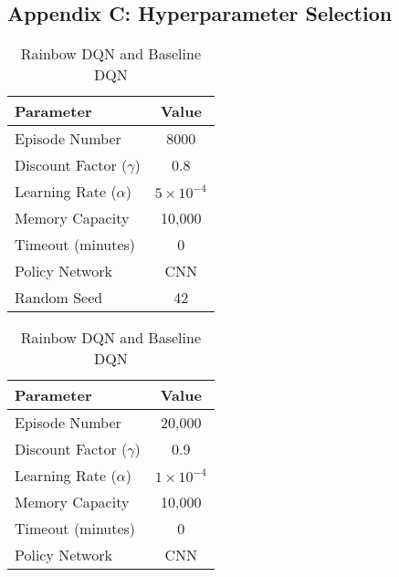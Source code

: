 \documentclass{article}
\begin{document}
\subsection*{Appendix C: Hyperparameter Selection}
\label{sec:hyperparametwe_selection}
\begin{table}[ht]
    \centering
    \begin{minipage}{0.45\textwidth}
        \centering
        \begin{tabular}{|l|c|}
        \hline
        \textbf{Parameter}      & \textbf{Value} \\ \hline
        Episode Number          & 8000           \\ \hline
        Discount Factor (\(\gamma\)) & 0.8             \\ \hline
        Learning Rate (\(\alpha\))   & \(5 \times 10^{-4}\) \\ \hline
        Memory Capacity         & 10,000         \\ \hline
        Timeout (minutes)       & 0              \\ \hline
        Policy Network          & CNN            \\ \hline
        Random Seed             & 42             \\ \hline
        \end{tabular}
        \vspace*{4pt}
        \caption{DQN extensions}
        \label{tab:algorithm_performance}
    \end{minipage}
    \hfill
    \begin{minipage}{0.45\textwidth}
        \centering
        \begin{tabular}{|l|c|}
        \hline
        \textbf{Parameter}      & \textbf{Value} \\ \hline
        Episode Number          & 20,000           \\ \hline
        Discount Factor (\(\gamma\)) & 0.9             \\ \hline
        Learning Rate (\(\alpha\))   & \(1 \times 10^{-4}\) \\ \hline
        Memory Capacity         & 10,000         \\ \hline
        Timeout (minutes)       & 0              \\ \hline
        Policy Network          & CNN            \\ \hline
        \end{tabular}
        \vspace*{4pt}
        \caption{Rainbow DQN and Baseline DQN}
        \label{tab:dqn_extensions}
    \end{minipage}
\end{table}
\end{document}
